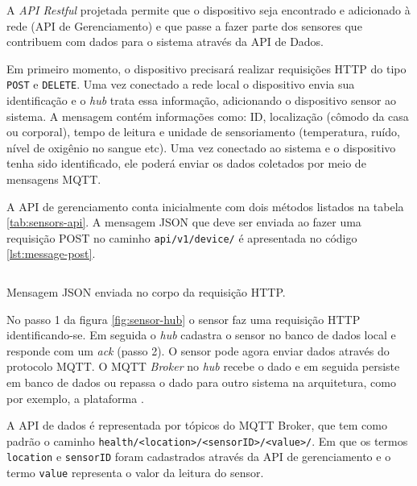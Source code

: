 A \textit{API Restful} projetada permite que o dispositivo seja encontrado e
adicionado à rede (API de Gerenciamento) e que passe a fazer parte dos sensores
que contribuem com dados para o sistema através da API de Dados.


Em primeiro momento, o dispositivo precisará realizar requisições HTTP do tipo
\texttt{POST} e \texttt{DELETE}. Uma vez conectado a rede local o dispositivo envia sua
identificação e o \textit{hub} trata essa informação, adicionando o dispositivo
sensor ao sistema. A mensagem contém informações como: ID, localização (cômodo da casa
ou corporal), tempo de leitura e unidade de sensoriamento (temperatura, ruído,
nível de oxigênio no sangue etc). Uma vez conectado ao sistema e o dispositivo
tenha sido identificado, ele poderá enviar os dados coletados por meio de
mensagens MQTT. 

A API de gerenciamento conta inicialmente com dois métodos listados na tabela
\ref{tab:sensors-api}. A mensagem JSON que deve ser enviada ao fazer uma
requisição POST no caminho \texttt{api/v1/device/} é apresentada no código
\ref{lst:message-post}.

\begin{listing}[ht!]
\inputminted{json}{codigos/message-post.json}
\caption{Mensagem JSON enviada no corpo da requisição HTTP.}
\label{lst:message-post}
\end{listing}

No passo 1 da figura \ref{fig:sensor-hub} o sensor faz uma requisição HTTP
identificando-se. Em seguida o \textit{hub} cadastra o sensor no banco de dados
local e responde com um \textit{ack} (passo 2). O sensor pode agora enviar
dados através do protocolo MQTT. O MQTT \textit{Broker} no \textit{hub} recebe
o dado e em seguida persiste em banco de dados ou repassa o dado para outro
sistema na arquitetura, como por exemplo, a plataforma \nextsaude.


A API de dados é representada por tópicos do MQTT Broker, que tem como padrão
o caminho \texttt{health/<location>/<sensorID>/<value>/}. Em que os termos 
\texttt{location} e \texttt{sensorID} foram cadastrados através da API de
gerenciamento e o termo \texttt{value} representa o valor da leitura do sensor.
